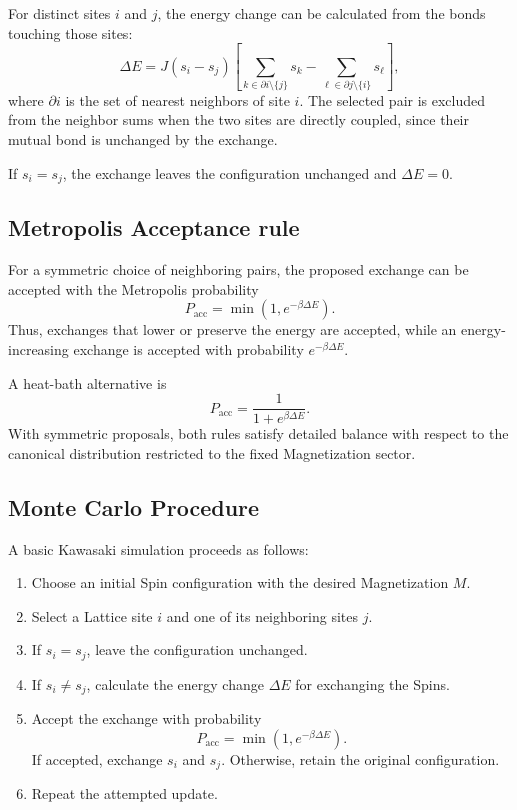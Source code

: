 \documentclass[a4paper, 10pt, onepage]{elegantbook}
\begin{document}
{For distinct sites \(i\) and \(j\), the energy change can be calculated
from the bonds touching those sites:
\[
  \Delta E
  =
  J(s_i-s_j)
  \left[
    \sum_{k\in\partial i\setminus\{j\}}s_k
    -
    \sum_{\ell\in\partial j\setminus\{i\}}s_\ell
  \right],
\]
where \(\partial i\) is the set of nearest neighbors of site \(i\).
The selected pair is excluded from the neighbor sums when the two sites
are directly coupled, since their mutual bond is unchanged by the
exchange.

If \(s_i=s_j\), the exchange leaves the configuration unchanged and
\(\Delta E=0\).

\subsection{Metropolis Acceptance rule}

For a symmetric choice of neighboring pairs, the proposed exchange can
be accepted with the Metropolis probability
\[
  P_{\mathrm{acc}}
  =
  \min\left(1,e^{-\beta\Delta E}\right).
\]
Thus, exchanges that lower or preserve the energy are accepted, while
an energy-increasing exchange is accepted with probability
\(e^{-\beta\Delta E}\).

A heat-bath alternative is
\[
  P_{\mathrm{acc}}
  =
  \frac{1}{1+e^{\beta\Delta E}}.
\]
With symmetric proposals, both rules satisfy detailed balance with
respect to the canonical distribution restricted to the fixed
Magnetization sector.

\subsection{Monte Carlo Procedure}

A basic Kawasaki simulation proceeds as follows:

\begin{enumerate}
  \item Choose an initial Spin configuration with the desired
        Magnetization \(M\).
  \item Select a Lattice site \(i\) and one of its neighboring sites
        \(j\).
  \item If \(s_i=s_j\), leave the configuration unchanged.
  \item If \(s_i\ne s_j\), calculate the energy change \(\Delta E\) for
        exchanging the Spins.
  \item Accept the exchange with probability
        \[
          P_{\mathrm{acc}}=\min\left(1,e^{-\beta\Delta E}\right).
        \]
        If accepted, exchange \(s_i\) and \(s_j\). Otherwise, retain the
        original configuration.
  \item Repeat the attempted update.
\end{enumerate}

}
\end{document}
